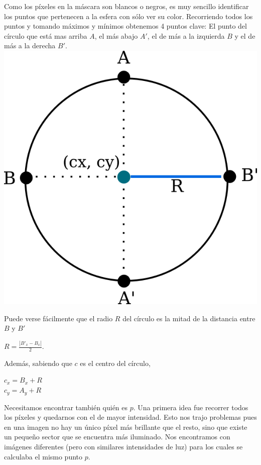 Como los píxeles en la máscara son blancos o negros, es muy sencillo identificar los puntos que pertenecen a la esfera con sólo ver su color. Recorriendo todos los puntos y tomando máximos y mínimos obtenemos 4 puntos clave: El punto del círculo que está mas arriba $A$, el más abajo $A'$, el de más a la izquierda $B$ y el de más a la derecha $B'$. \\

{\centering
    \includegraphics[scale=0.5]{informe/imagenes/esfera/circulo.png} \\
}

Puede verse fácilmente que el radio $R$ del círculo es la mitad de la distancia entre $B$ y $B'$

\begin{center}
$R = \frac{|B'_x - B_x|}{2}$.
\end{center}

Además, sabiendo que $c$ es el centro del círculo,

\begin{center}
    $c_{x} = B_x + R$ \\
    $c_{y} = A_y + R$
\end{center}

Necesitamos encontrar también quién es $p$. Una primera idea fue recorrer todos los píxeles y quedarnos con el de mayor intensidad. Esto nos trajo problemas pues en una imagen no hay un único píxel más brillante que el resto, sino que existe un pequeño sector que se encuentra más iluminado. Nos encontramos con imágenes diferentes (pero con similares intensidades de luz) para los cuales se calculaba el mismo punto $p$. \\

